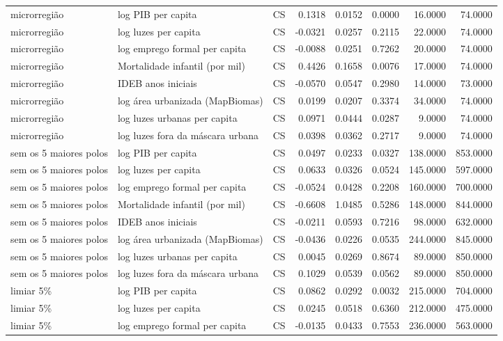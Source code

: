 \begin{table}
\begin{tabular}{lllrrrrr}
microrregião & log PIB per capita & CS & 0.1318 & 0.0152 & 0.0000 & 16.0000 & 74.0000 \\
microrregião & log luzes per capita & CS & -0.0321 & 0.0257 & 0.2115 & 22.0000 & 74.0000 \\
microrregião & log emprego formal per capita & CS & -0.0088 & 0.0251 & 0.7262 & 20.0000 & 74.0000 \\
microrregião & Mortalidade infantil (por mil) & CS & 0.4426 & 0.1658 & 0.0076 & 17.0000 & 74.0000 \\
microrregião & IDEB anos iniciais & CS & -0.0570 & 0.0547 & 0.2980 & 14.0000 & 73.0000 \\
microrregião & log área urbanizada (MapBiomas) & CS & 0.0199 & 0.0207 & 0.3374 & 34.0000 & 74.0000 \\
microrregião & log luzes urbanas per capita & CS & 0.0971 & 0.0444 & 0.0287 & 9.0000 & 74.0000 \\
microrregião & log luzes fora da máscara urbana & CS & 0.0398 & 0.0362 & 0.2717 & 9.0000 & 74.0000 \\
sem os 5 maiores polos & log PIB per capita & CS & 0.0497 & 0.0233 & 0.0327 & 138.0000 & 853.0000 \\
sem os 5 maiores polos & log luzes per capita & CS & 0.0633 & 0.0326 & 0.0524 & 145.0000 & 597.0000 \\
sem os 5 maiores polos & log emprego formal per capita & CS & -0.0524 & 0.0428 & 0.2208 & 160.0000 & 700.0000 \\
sem os 5 maiores polos & Mortalidade infantil (por mil) & CS & -0.6608 & 1.0485 & 0.5286 & 148.0000 & 844.0000 \\
sem os 5 maiores polos & IDEB anos iniciais & CS & -0.0211 & 0.0593 & 0.7216 & 98.0000 & 632.0000 \\
sem os 5 maiores polos & log área urbanizada (MapBiomas) & CS & -0.0436 & 0.0226 & 0.0535 & 244.0000 & 845.0000 \\
sem os 5 maiores polos & log luzes urbanas per capita & CS & 0.0045 & 0.0269 & 0.8674 & 89.0000 & 850.0000 \\
sem os 5 maiores polos & log luzes fora da máscara urbana & CS & 0.1029 & 0.0539 & 0.0562 & 89.0000 & 850.0000 \\
limiar 5\% & log PIB per capita & CS & 0.0862 & 0.0292 & 0.0032 & 215.0000 & 704.0000 \\
limiar 5\% & log luzes per capita & CS & 0.0245 & 0.0518 & 0.6360 & 212.0000 & 475.0000 \\
limiar 5\% & log emprego formal per capita & CS & -0.0135 & 0.0433 & 0.7553 & 236.0000 & 563.0000 \\

\end{tabular}
\end{table}
